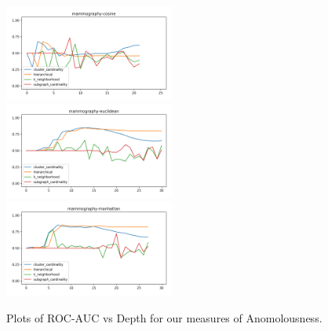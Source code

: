\begin{figure}[!t]
\includegraphics[width=2.2in]{kdd/static/auc_vs_depth/mammography-cosine.png}
\includegraphics[width=2.2in]{kdd/static/auc_vs_depth/mammography-euclidean.png}
\includegraphics[width=2.2in]{kdd/static/auc_vs_depth/mammography-manhattan.png}

\caption{
Plots of ROC-AUC vs Depth for our measures of Anomolousness.
}

\label{results:datasets_4}
\end{figure}






